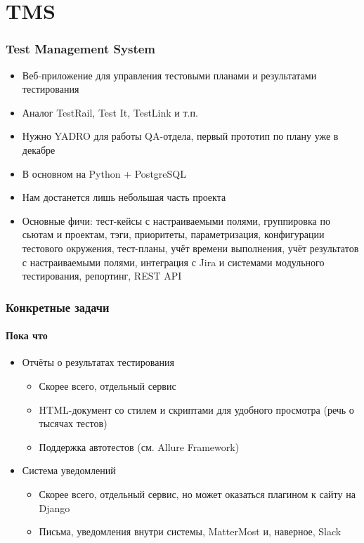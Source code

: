 \documentclass{slides-style}
\begin{document}
    \begin{frame}[plain]
        \titlepage
    \end{frame}

    \section{TMS}

    \begin{frame}
        \frametitle{Test Management System}
        \begin{itemize}
            \item Веб-приложение для управления тестовыми планами и результатами тестирования
            \item Аналог TestRail, Test It, TestLink и т.п.
            \item Нужно YADRO для работы QA-отдела, первый прототип по плану уже в декабре
            \item В основном на Python + PostgreSQL
            \item Нам достанется лишь небольшая часть проекта
            \item Основные фичи: тест-кейсы с настраиваемыми полями, группировка по сьютам и проектам, тэги, приоритеты, параметризация, конфигурации тестового окружения, тест-планы, учёт времени выполнения, учёт результатов с настраиваемыми полями, интеграция с Jira и системами модульного тестирования, репортинг, REST API
        \end{itemize}
    \end{frame}

    \begin{frame}
        \frametitle{Конкретные задачи}
        \framesubtitle{Пока что}
        \begin{itemize}
            \item Отчёты о результатах тестирования
            \begin{itemize}
                \item Скорее всего, отдельный сервис
                \item HTML-документ со стилем и скриптами для удобного просмотра (речь о тысячах тестов)
                \item Поддержка автотестов (см. Allure Framework)
            \end{itemize}
            \item Система уведомлений
            \begin{itemize}
                \item Скорее всего, отдельный сервис, но может оказаться плагином к сайту на Django
                \item Письма, уведомления внутри системы, MatterMost и, наверное, Slack
            \end{itemize}
        \end{itemize}
    \end{frame}
\end{document}
